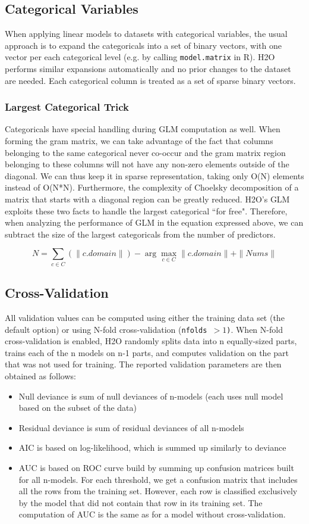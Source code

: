 \subsection{Categorical Variables}
When applying linear models to datasets with categorical variables, the usual approach is to expand the categoricals into a set of binary vectors, with one vector per each categorical level (e.g. by calling {\texttt{model.matrix}} in R). H2O performs similar expansions automatically and no prior changes to the dataset are needed. Each categorical column is treated as a set of sparse binary vectors.

\subsubsection{Largest Categorical Trick}
Categoricals have special handling during GLM computation as well. When forming the gram matrix, we can take advantage of  the fact that columns belonging to the same categorical never co-occur and the gram matrix region belonging to these columns will not have any non-zero elements outside of the diagonal. We can thus keep it in sparse representation, taking only O(N) elements instead of O(N*N). Furthermore, the complexity of Choelsky decomposition of a matrix that starts with a diagonal region can be greatly reduced. H2O's GLM exploits these two facts to handle the largest categorical ``for free". Therefore, when analyzing the performance of GLM in the equation expressed above, we can subtract the size of the largest categoricals from the number of predictors.

$$N = \sum_{c \in C} (\|c.domain\|) - \arg\max_{c \in C} \|c.domain\| + \|Nums\| $$

\subsection{Cross-Validation}
All validation values can be computed using either the training data set (the default option) or using N-fold cross-validation (\texttt{nfolds $> 1$)}. When N-fold cross-validation is enabled, H2O randomly splits data into n equally-sized parts, trains each of the n models on n-1 parts, and computes validation on the part that was not used for training. The reported validation parameters are then obtained as follows:
\begin{itemize} 
\item Null deviance is sum of null deviances of n-models (each uses null model based on the subset of the data)
\item Residual deviance is sum of residual deviances of all n-models
\item AIC is based on log-likelihood, which is summed up similarly to deviance
\item AUC is based on ROC curve build  by summing up confusion matrices built for all n-models.
For each threshold, we get a confusion matrix that includes all the rows from
the training set. However, each row is classified exclusively by the model
that did not contain that row in its training set. The computation of AUC is the same as for a model without cross-validation. 
\end{itemize}

